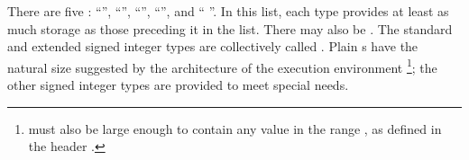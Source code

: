 \pnum
{}%
%
There are five  :
%
%
%
%
%
``'', ``'', ``'',
``'', and ``  ''. In
this list, each type provides at least as much storage as those
preceding it in the list.
%
%
%
%
There may also be  . The standard and
extended signed integer types are collectively called .
%
Plain
s have the natural size suggested by the architecture of the
execution environment%
\footnote{ must also be large enough
to contain any value in the range
,
as defined in the header .};
the other signed integer types are provided to meet special needs.


